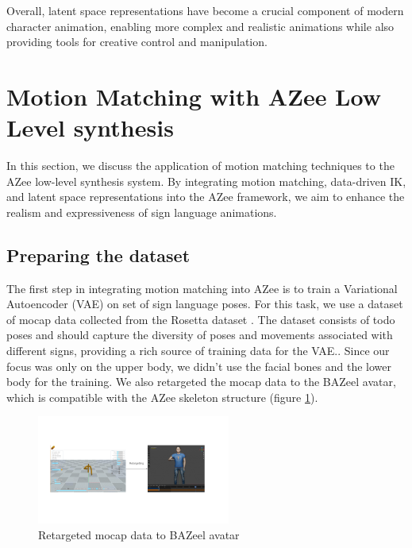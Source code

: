 \documentclass[../../main.tex]{subfiles}
\begin{document}
Overall, latent space representations have become a crucial component of modern character animation, enabling more complex and realistic animations while also providing tools for creative control and manipulation.

\section{Motion Matching with AZee Low Level synthesis}
\label{ch:motion_matching:motion_matching_with_azee}

In this section, we discuss the application of motion matching techniques to the AZee low-level synthesis system. By integrating motion matching, data-driven IK, and latent space representations into the AZee framework, we aim to enhance the realism and expressiveness of sign language animations.

\subsection{Preparing the dataset}
\label{ch:motion_matching:motion_matching_with_azee:dataset}

The first step in integrating motion matching into AZee is to train a Variational Autoencoder (VAE) on set of sign language poses. For this task, we use a dataset of mocap data collected from the Rosetta dataset \cite{TODO}. The dataset consists of todo poses and should capture the diversity of poses and movements associated with different signs, providing a rich source of training data for the VAE.. Since our focus was only on the upper body, we didn't use the facial bones and the lower body for the training. We also retargeted the mocap data to the BAZeel avatar, which is compatible with the AZee skeleton structure (figure \ref{fig:retargeted}).

\begin{figure}
  \centering \includegraphics[width = 2.5in]{chapters/motion_matching/images/retargeted.png}
  \caption{Retargeted mocap data to BAZeel avatar}
  \label{fig:retargeted}
\end{figure}
\end{document}
